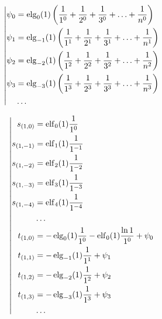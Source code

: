\begin{equation*} \left| \begin{aligned}
\psi_0 &= \elg_0(1) \left(
  \frac{1}{1^0}
+ \frac{1}{2^0}
+ \frac{1}{3^0}
+ \ldots
+ \frac{1}{n^0} \right) \\
%
\psi_1 &= \elg_{-1}(1) \left(
  \frac{1}{1^1}
+ \frac{1}{2^1}
+ \frac{1}{3^1}
+ \ldots
+ \frac{1}{n^1} \right) \\
%
\psi_2 &= \elg_{-2}(1) \left(
  \frac{1}{1^2}
+ \frac{1}{2^2}
+ \frac{1}{3^2}
+ \ldots
+ \frac{1}{n^2} \right) \\
%
\psi_3 &= \elg_{-3}(1) \left(
  \frac{1}{1^3}
+ \frac{1}{2^3}
+ \frac{1}{3^3}
+ \ldots
+ \frac{1}{n^3} \right) \\
%
&\ldots \\
\end{aligned} \right. \end{equation*}

\begin{equation*} \left| \begin{aligned}
s_{(1,0)} &=
  \elf_0(1) \frac{1}{1^0} \\
%
s_{(1,-1)} &=
  \elf_1(1) \frac{1}{1^{-1}} \\
%
s_{(1,-2)} &=
  \elf_2(1) \frac{1}{1^{-2}} \\
%
s_{(1,-3)} &=
  \elf_3(1) \frac{1}{1^{-3}} \\
%
s_{(1,-4)} &=
  \elf_4(1) \frac{1}{1^{-4}} \\
%
&\ldots \\
%
t_{(1,0)} &=
- \elg_0(1) \frac{1}{1^0}
- \elf_0(1) \frac{\ln{1}}{1^0}
+ \psi_0 \\
%
t_{(1,1)} &=
- \elg_{-1}(1) \frac{1}{1^1}
+ \psi_1 \\
%
t_{(1,2)} &=
- \elg_{-2}(1) \frac{1}{1^2}
+ \psi_2 \\
%
t_{(1,3)} &=
- \elg_{-3}(1) \frac{1}{1^3}
+ \psi_3 \\
%
&\ldots \\
\end{aligned} \right. \end{equation*}

